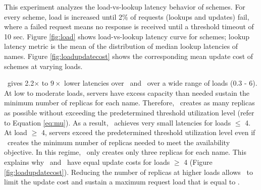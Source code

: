{%




This experiment analyzes the load-vs-lookup latency behavior of schemes. For every scheme, load is increased  until  2\% of requests (lookups and updates) fail, where a failed request means no response is received until a threshold timeout of 10 sec. Figure \ref{fig:load} shows load-vs-lookup latency curve for schemes; lookup latency metric is the mean of the distribution of median lookup latencies of names. Figure \ref{fig:loadupdatecost} shows the corresponding mean update cost of schemes at varying loads. 

\auspice\ gives 2.2$\times$ to $9\times$ lower latencies over \staticthree\ and \codons\ over a wide range of loads (0.3 - 6). At low to moderate loads, servers have excess capacity than needed sustain the minimum number of replicas for each name. Therefore,  \auspice\ creates as many replicas as possible without exceeding the predetermined threshold utilization level (refer to Equation \ref{eq:mu}). As a result, \auspice\ achieves very small latencies for loads $\leq$ 4. 
At load $\geq$ 4, servers exceed the predetermined threshold utilization level even if \auspice\ creates the minimum number of replicas needed to meet the availability objective. In this regime, \auspice\ only creates only three replicas for each name. This explains why \auspice\ and \staticthree\ have equal update costs for loads $\geq$ 4 (Figure \ref{fig:loadupdatecost}). Reducing the number of replicas at higher loads allows \auspice\ to limit the update cost and sustain a maximum request load that is equal to \staticthree.


}
